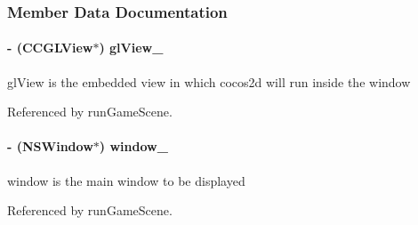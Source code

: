 \subsubsection{Member Data Documentation}
\hypertarget{interface_app_delegate_a5f256d1ae550f33820c6730d70088694}{
\paragraph[{gl\-View\-\_\-}]{\setlength{\rightskip}{0pt plus 5cm}-\/ (C\-C\-G\-L\-View$\ast$) gl\-View\-\_\-\hspace{0.3cm}{\ttfamily [protected]}}}\label{dd/d52/interface_app_delegate_a5f256d1ae550f33820c6730d70088694}
gl\-View is the embedded view in which cocos2d will run inside the window 

Referenced by run\-Game\-Scene.

\hypertarget{interface_app_delegate_a5338c82d195ce50c948cbbf1b974665b}{
\paragraph[{window\-\_\-}]{\setlength{\rightskip}{0pt plus 5cm}-\/ (N\-S\-Window$\ast$) window\-\_\-\hspace{0.3cm}{\ttfamily [protected]}}}\label{dd/d52/interface_app_delegate_a5338c82d195ce50c948cbbf1b974665b}
window is the main window to be displayed 

Referenced by run\-Game\-Scene.



